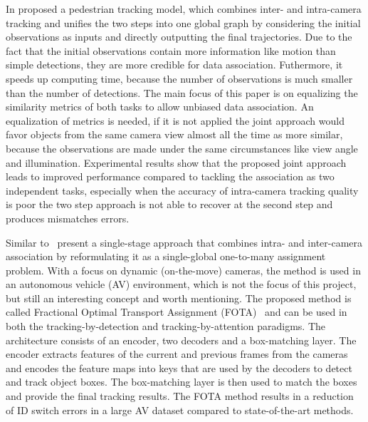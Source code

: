 In \citeyear{Chen17a} \textcite{Chen17a} proposed a pedestrian tracking model, which combines inter- and intra-camera tracking and unifies the two steps into one global graph by considering the initial observations as inputs and directly outputting the final trajectories. Due to the fact that the initial observations contain more information like motion than simple detections, they are more credible for data association. Futhermore, it speeds up computing time, because the number of observations is much smaller than the number of detections. The main focus of this paper is on equalizing the similarity metrics of both tasks to allow unbiased data association. An equalization of metrics is needed, if it is not applied the joint approach would favor objects from the same camera view almost all the time as more similar, because the observations are made under the same circumstances like view angle and illumination. Experimental results show that the proposed joint approach leads to improved performance compared to tackling the association as two independent tasks, especially when the accuracy of intra-camera tracking quality is poor the two step approach is not able to recover at the second step and produces mismatches errors.

Similar to~\cite{Chen17a} \citeauthor{Nguyen22b} present a single-stage approach that combines intra- and inter-camera association by reformulating it as a single-global one-to-many assignment problem. With a focus on dynamic (on-the-move) cameras, the method is used in an autonomous vehicle (AV) environment, which is not the focus of this project, but still an interesting concept and worth mentioning. The proposed method is called Fractional Optimal Transport Assignment (FOTA)~\cite{Nguyen22b} and can be used in both the tracking-by-detection and tracking-by-attention paradigms. The architecture consists of an encoder, two decoders and a box-matching layer. The encoder extracts features of the current and previous frames from the cameras and encodes the feature maps into keys that are used by the decoders to detect and track object boxes. The box-matching layer is then used to match the boxes and provide the final tracking results. The FOTA method results in a reduction of ID switch errors in a large AV dataset compared to state-of-the-art methods.

